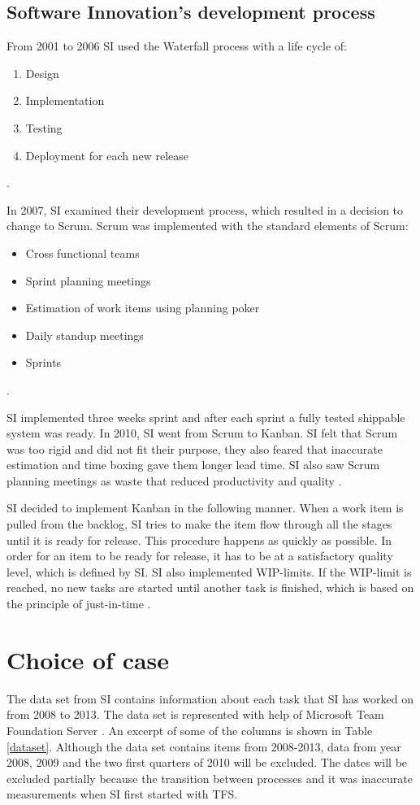\documentclass[UKenglish]{ifimaster}  %
\begin{document}
\subsection{Software Innovation's development process}
From 2001 to 2006 SI used the Waterfall process with a life cycle of:
\begin{enumerate}[noitemsep,topsep=0pt,parsep=0pt,partopsep=0pt]
\item Design
\item Implementation 
\item Testing
\item Deployment for each new release
\end{enumerate} 
\parencite{Dag}. 

In 2007, SI examined their development process, which resulted in a decision to change to Scrum. Scrum was implemented with the standard elements of Scrum:
\begin{itemize}[noitemsep,topsep=0pt,parsep=0pt,partopsep=0pt]
\item Cross functional teams
\item Sprint planning meetings 
\item Estimation of work items using planning poker
\item Daily standup meetings
\item Sprints
\end{itemize}
\parencite{Dag}. 

SI implemented three weeks sprint and after each sprint a fully tested shippable system was ready. In 2010, SI went from Scrum to Kanban. SI felt that Scrum was too rigid and did not fit their purpose, they also feared that inaccurate estimation and time boxing gave them longer lead time. SI also saw Scrum planning meetings as waste that reduced productivity and quality \parencite{Dag}. 

SI decided to implement Kanban in the following manner. When a work item is pulled from the backlog, SI tries to make the item flow through all the stages until it is ready for release. This procedure happens as quickly as possible. In order for an item to be ready for release, it has to be at a satisfactory quality level, which is defined by SI. SI also implemented WIP-limits. If the WIP-limit is reached, no new tasks are started until another task is finished, which is based on the principle of just-in-time \parencite{Dag}.

\section{Choice of case}
\label{sec:coc}
The data set from SI contains information about each task that SI has worked on from 2008 to 2013. The data set is represented with help of Microsoft Team Foundation Server \parencite{Microsoft}. An excerpt of some of the columns is shown in Table \ref{dataset}. Although the data set contains items from 2008-2013, data from year 2008, 2009 and the two first quarters of 2010 will be excluded. The dates will be excluded partially because the transition between processes and it was inaccurate measurements when SI first started with TFS.
\end{document}
